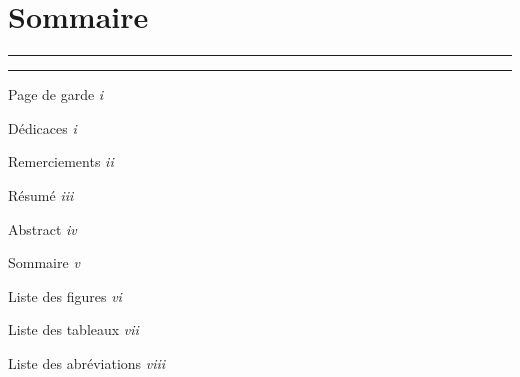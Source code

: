 \documentclass[12pt,a4paper]{report}
\begin{document}
	
	\chapter*{Sommaire}
	
	\vspace{0.5cm}
	
	{
		\noindent\textcolor{bleuPrincipal}{\rule{\linewidth}{0.8pt}}
		\vspace{2pt}
		
		
		\vspace{4pt}
		\noindent\textcolor{bleuPrincipal}{\rule{\linewidth}{0.4pt}}
	}
	
	\vspace{4pt}
	
	\begin{list}{}{%
			\setlength{\leftmargin}{0pt}
			\setlength{\itemsep}{4pt}
		}
		\item \hspace{0pt} Page de garde \dotfill \textit{i}
		\item \hspace{0pt} D\'edicaces \dotfill \textit{i}
		\item \hspace{0pt} Remerciements \dotfill \textit{ii}
		\item \hspace{0pt} R\'esum\'e \dotfill \textit{iii}
		\item \hspace{0pt} Abstract \dotfill \textit{iv}
		\item \hspace{0pt} Sommaire \dotfill \textit{v}
		\item \hspace{0pt} Liste des figures \dotfill \textit{vi}
		\item \hspace{0pt} Liste des tableaux \dotfill \textit{vii}
		\item \hspace{0pt} Liste des abr\'eviations \dotfill \textit{viii}
	\end{list}
	
	\vspace{0.6cm}
	
\end{document}
